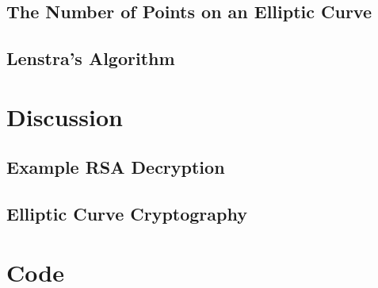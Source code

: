 \documentclass[a4paper,12pt,titlepage,oneside]{article}
\begin{document}
\subsection{The Number of Points on an Elliptic Curve}

\subsection{Lenstra's Algorithm}

\clearpage

\section{Discussion}
\subsection{Example RSA Decryption}

\subsection{Elliptic Curve Cryptography}

\clearpage

\appendix
\section{Code}
\label{codeappendix}

\clearpage


\end{document}
